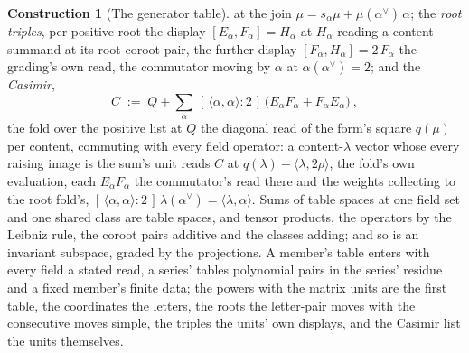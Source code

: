\documentclass[11pt]{article}
\theoremstyle{definition}
\newtheorem{construction}{Construction}
\begin{document}
\begin{construction}[The generator table]
at the join $\mu=s_\alpha\mu+\mu(\alpha^\vee)\,\alpha$; the
\emph{root triples}, per positive root the display
$[E_\alpha,F_\alpha]=H_\alpha$ at $H_\alpha$ reading a content
summand at its root coroot pair, the further display
$[F_\alpha,H_\alpha]=2\,F_\alpha$ the grading's own read, the
commutator moving by $\alpha$ at $\alpha(\alpha^\vee)=2$; and the
\emph{Casimir},
\[
C\;:=\;Q+\sum_{\alpha}\,[\,\langle\alpha,\alpha\rangle:2\,]\,
\big(E_\alpha F_\alpha+F_\alpha E_\alpha\big)\ ,
\]
the fold over the positive list at $Q$ the diagonal read of the
form's square $q(\mu)$ per content, commuting with every field
operator: a content-$\lambda$ vector whose every raising image is
the sum's unit reads $C$ at
$q(\lambda)+\langle\lambda,2\rho\rangle$, the fold's own
evaluation, each $E_\alpha F_\alpha$ the commutator's read there
and the weights collecting to the root fold's,
$[\,\langle\alpha,\alpha\rangle:2\,]\,\lambda(\alpha^\vee)
=\langle\lambda,\alpha\rangle$. Sums of
table spaces at one field set and one shared class are table
spaces, and tensor products, the operators by the Leibniz rule,
the coroot pairs additive and the classes adding; and so is an
invariant subspace, graded by the projections. A member's table enters with every field a
stated read, a
series' tables polynomial pairs in the series' residue and a
fixed member's finite data; the powers with the matrix units are
the first table, the coordinates the letters, the roots the
letter-pair moves with the consecutive moves simple, the triples
the units' own displays, and the Casimir list the units
themselves.
\end{construction}
\end{document}
